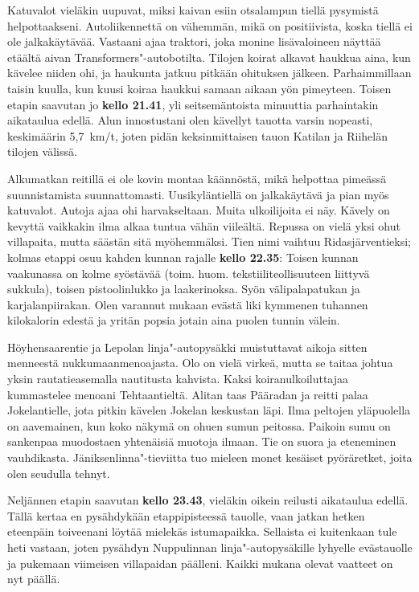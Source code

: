 \begin{multicols}{2}
Katuvalot vieläkin uupuvat, miksi kaivan esiin otsalampun tiellä pysymistä 
helpottaakseni. Autoliikennettä on vähemmän, mikä on positiivista, koska 
tiellä ei ole jalkakäytävää. Vastaani ajaa traktori, joka monine 
lisävaloineen näyttää etäältä aivan Transformers"-autobotilta. Tilojen 
koirat alkavat haukkua aina, kun kävelee niiden ohi, ja haukunta jatkuu 
pitkään ohituksen jälkeen. Parhaimmillaan taisin kuulla, kun kuusi koiraa 
haukkui samaan aikaan yön pimeyteen. Toisen etapin saavutan jo \textbf{kello 
21.41}, yli seitsemäntoista minuuttia parhaintakin aikataulua edellä. Alun 
innostustani olen kävellyt tauotta varsin nopeasti, keskimäärin 5,7~km/t, 
joten pidän keksinmittaisen tauon Katilan ja Riihelän tilojen välissä.

Alkumatkan reitillä ei ole kovin montaa käännöstä, mikä helpottaa 
pimeässä suunnistamista suunnattomasti. Uusikyläntiellä on jalkakäytävä 
ja pian myös katuvalot. Autoja ajaa ohi harvakseltaan. Muita ulkoilijoita ei 
näy. Kävely on kevyttä vaikkakin ilma alkaa tuntua vähän viileältä. 
Repussa on vielä yksi ohut villapaita, mutta säästän sitä myöhemmäksi. 
Tien nimi vaihtuu Ridasjärventieksi; kolmas etappi osuu kahden kunnan rajalle 
\textbf{kello 22.35}: Toisen kunnan vaakunassa on kolme syöstävää (toim. 
huom. tekstiiliteollisuuteen liittyvä sukkula), toisen pistoolinlukko ja 
laakerinoksa. Syön välipalapatukan ja karjalanpiirakan. Olen varannut mukaan 
evästä liki kymmenen tuhannen kilokalorin edestä ja yritän popsia jotain 
aina puolen tunnin välein.

Höyhensaarentie ja Lepolan linja"-autopysäkki muistuttavat aikoja sitten 
menneestä nukkumaanmenoajasta. Olo on vielä virkeä, mutta se taitaa johtua 
yksin rautatieasemalla nautitusta kahvista. Kaksi koiranulkoiluttajaa 
kummastelee menoani Tehtaantieltä. Alitan taas Pääradan ja reitti palaa 
Jokelantielle, jota pitkin kävelen Jokelan keskustan läpi. Ilma peltojen 
yläpuolella on aavemainen, kun koko näkymä on ohuen sumun peitossa. Paikoin 
sumu on sankenpaa muodostaen yhtenäisiä muotoja ilmaan. Tie on suora ja 
eteneminen vauhdikasta. Jäniksenlinna"-tieviitta tuo mieleen monet kesäiset 
pyöräretket, joita olen seudulla tehnyt. 

Neljännen etapin saavutan \textbf{kello 23.43}, vieläkin oikein reilusti 
aikataulua edellä. Tällä kertaa en pysähdykään etappipisteessä tauolle, 
vaan jatkan hetken eteenpäin toiveenani löytää mielekäs istumapaikka. 
Sellaista ei kuitenkaan tule heti vastaan, joten pysähdyn Nuppulinnan 
linja"-autopysäkille lyhyelle evästauolle ja pukemaan viimeisen villapaidan 
päälleni. Kaikki mukana olevat vaatteet on nyt päällä.


\end{multicols}
